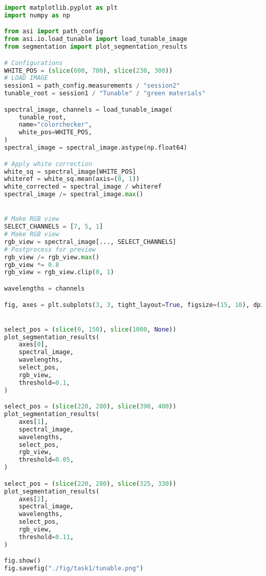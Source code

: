 \begin{lstlisting}[language=python, caption=Segmentation of green materials by Tunable light camera, label={code:green-tunable}]
import matplotlib.pyplot as plt
import numpy as np

from asi import path_config
from asi.io.load_tunable import load_tunable_image
from segmentation import plot_segmentation_results

# Configurations
WHITE_POS = (slice(600, 700), slice(230, 300))
# LOAD IMAGE
session1 = path_config.measurements / "session2"
tunable_root = session1 / "Tunable" / "green materials"

spectral_image, channels = load_tunable_image(
    tunable_root,
    name="colorchecker",
    white_pos=WHITE_POS,
)
spectral_image = spectral_image.astype(np.float64)

# Apply white correction
white_sq = spectral_image[WHITE_POS]
whiteref = white_sq.mean(axis=(0, 1))
white_corrected = spectral_image / whiteref
spectral_image /= spectral_image.max()


# Make RGB view
SELECT_CHANNELS = [7, 5, 1]
# Make RGB view
rgb_view = spectral_image[..., SELECT_CHANNELS]
# Postprocess for preview
rgb_view /= rgb_view.max()
rgb_view *= 0.8
rgb_view = rgb_view.clip(0, 1)

wavelengths = channels

fig, axes = plt.subplots(3, 3, tight_layout=True, figsize=(15, 10), dpi=80)


select_pos = (slice(0, 150), slice(1000, None))
plot_segmentation_results(
    axes[0],
    spectral_image,
    wavelengths,
    select_pos,
    rgb_view,
    threshold=0.1,
)

select_pos = (slice(220, 280), slice(390, 400))
plot_segmentation_results(
    axes[1],
    spectral_image,
    wavelengths,
    select_pos,
    rgb_view,
    threshold=0.05,
)

select_pos = (slice(220, 280), slice(325, 330))
plot_segmentation_results(
    axes[2],
    spectral_image,
    wavelengths,
    select_pos,
    rgb_view,
    threshold=0.11,
)

fig.show()
fig.savefig("./fig/task1/tunable.png")
\end{lstlisting}